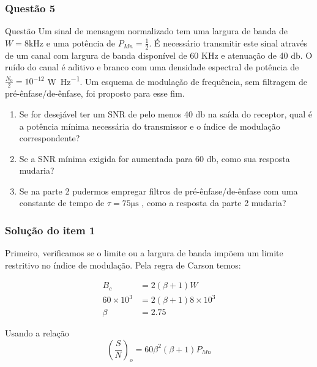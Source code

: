 \documentclass{beamer}
\begin{document}
\begin{frame}
  \frametitle{Questão 5}
\scriptsize
  \begin{block}{Questão}
    Um sinal de mensagem normalizado tem uma largura de banda de $W = 8 \si{\kilo \hertz}$
     e uma potência de $P_{Mn} = \frac{1}{2}$. É necessário transmitir este sinal 
     através de um canal com largura de banda disponível de 60 KHz e atenuação de 40 \si{\decibel}.
     O ruído do canal é aditivo e branco com uma densidade espectral de potência de 
     $\frac{N_0}{2} = 10^{-12}$ \si{\watt \per \hertz}. Um esquema de modulação de frequência, 
     sem filtragem de pré-ênfase/de-ênfase, foi proposto para esse fim.

     \begin{enumerate}
      \item Se for desejável ter um SNR de pelo menos 40 \si{\decibel} na saída do receptor, qual é a potência mínima necessária do transmissor e o índice de modulação correspondente?
      \item Se a SNR mínima exigida for aumentada para 60 \si{\decibel}, como sua resposta mudaria?
      \item Se na parte 2 pudermos empregar filtros de pré-ênfase/de-ênfase com uma constante de tempo de $\tau = 75 \si{\micro \second} $ , como a resposta da parte 2 mudaria?
    \end{enumerate}
    
  \end{block}

\end{frame}




\begin{frame}
  \frametitle{Solução do item 1}
  Primeiro, verificamos se o limite ou a largura de banda impõem um limite restritivo no índice de modulação. Pela regra de Carson temos:

\begin{align*}
B_c &= 2(\beta+1)W \\
60 \times 10^3 &= 2(\beta+1) 8 \times 10^3 \\
\beta &= 2.75
\end{align*}

Usando a relação $$\left(\frac{S}{N}\right)_o = 60 \beta^2(\beta+1)P_{Mn}$$


\end{frame}
\end{document}
